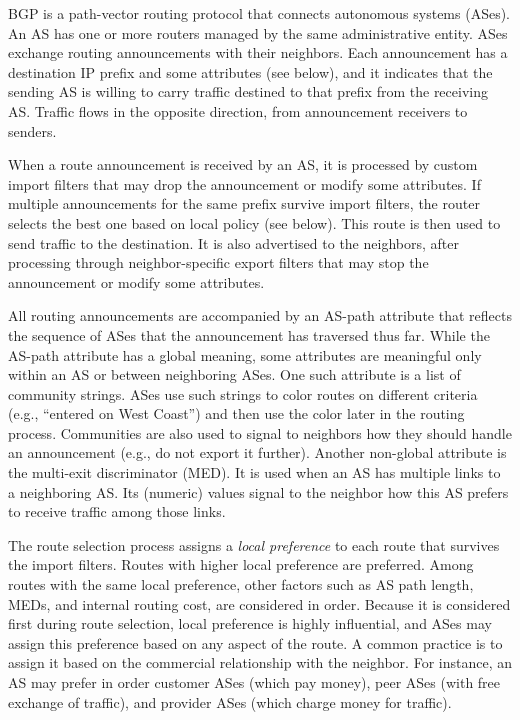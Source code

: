 \documentclass{sig-alternate-10pt}
\begin{document}
BGP is a path-vector routing protocol that connects autonomous systems (ASes). An AS has one or more routers managed by the same administrative entity. ASes exchange routing announcements with their neighbors. Each announcement has a destination IP prefix and some attributes (see below), and it indicates that the sending AS is willing to carry traffic destined to that prefix from the receiving AS. Traffic flows in the opposite direction, from announcement receivers to senders.

When a route announcement is received by an AS, it is processed by custom import filters that may drop the announcement or modify some attributes. If multiple announcements for the same prefix survive import filters, the router selects the best one based on local policy (see below). This route is then used to send traffic to the destination. It is also advertised to the neighbors, after processing through neighbor-specific export filters that may stop the announcement or modify some attributes.

All routing announcements are accompanied by an AS-path attribute that reflects the sequence of ASes that the announcement has traversed thus far. While the AS-path attribute has a global meaning, some attributes are meaningful only within an AS or between neighboring ASes.  One such attribute is a list of community strings. ASes use such strings to color routes on different criteria (e.g., ``entered on West Coast'') and then use the color later in the routing process.  Communities are also used to signal to neighbors how they should handle an announcement (e.g., do not export it further). Another non-global attribute is the multi-exit discriminator (MED). It is used when an AS has multiple links to a neighboring AS.  Its (numeric) values signal to the neighbor how this AS prefers to receive traffic among those links.

The route selection process assigns a {\em local preference} to each
route that survives the import filters. Routes with higher local
preference are preferred. Among routes with the same local preference,
other factors such as AS path length, MEDs, and internal routing cost, are considered in order. Because it is considered first during route selection, local preference is highly influential, and ASes may assign this preference based on any aspect of the route. A common practice is to assign it based on the commercial relationship with the neighbor. For instance, an AS may prefer in order customer ASes (which pay money), peer ASes (with free exchange of traffic), and provider ASes (which charge money for traffic).
\end{document}

